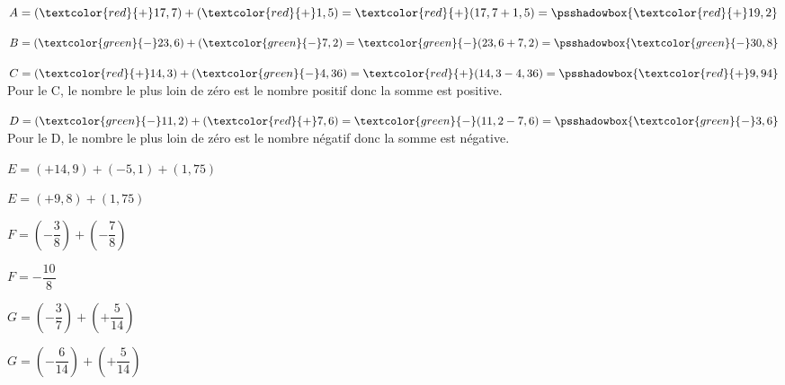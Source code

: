 \begin{exemple*1}
  \begin{itemize}
    \item[] $A=(\textcolor{red}{+}17,7)+ (\textcolor{red}{+}1,5)=\textcolor{red}{+}(17,7+1,5)=\psshadowbox{\textcolor{red}{+}19,2}$
    \item[] $B=(\textcolor{green}{-}23,6)+ (\textcolor{green}{-}7,2)=\textcolor{green}{-}(23,6+7,2)=\psshadowbox{\textcolor{green}{-}30,8}$
    \item[] $C=(\textcolor{red}{+}14,3 )+ (\textcolor{green}{-}4,36)=\textcolor{red}{+}(14,3-4,36)=\psshadowbox{\textcolor{red}{+}9,94}$
    \\
    Pour le C, le nombre le plus loin de zéro est le nombre positif donc la somme est positive.
    \par\vspace{0.5cm}
    \item[] $D=(\textcolor{green}{-}11,2)+ (\textcolor{red}{+}7,6)=\textcolor{green}{-}(11,2-7,6 )=\psshadowbox{\textcolor{green}{-}3,6}$
    \\
    Pour le D, le nombre le plus loin de zéro est le nombre négatif donc la somme est négative.
    \\
    \par\vspace{0.5cm}
    \begin{minipage}{7cm}
    \item[] $E=(+14,9)+(-5,1)+(1,75)$
    \item[] $E=(+9,8)+(1,75)$
    \item[] 
    \end{minipage}
    \begin{minipage}{5cm}
    \item[] $F=(-\dfrac38)+(-\dfrac78)$
    \item[] $F=-\dfrac{10}{8}$
    \item[] 
    \end{minipage}
    \begin{minipage}{6cm}
    \item[] $G=(-\dfrac37)+(+\dfrac{5}{14})$
    \item[] $G=(-\dfrac{6}{14})+(+\dfrac{5}{14})$
    \item[] 
    \end{minipage}
    \end{itemize} 
\end{exemple*1}